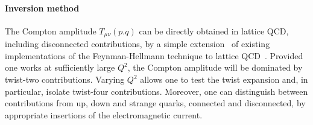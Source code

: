 \paragraph*{Inversion method} 
\label{Sec:InversionMethod}

The Compton amplitude $T_{\mu\nu}(p.q)$ can be directly obtained in lattice QCD, including disconnected contributions,  by a simple extension~\cite{Chambers:2017dov} of existing implementations of the Feynman-Hellmann technique to lattice QCD~\cite{Horsley:2012pz,Chambers:2014qaa,Chambers:2015bka}. Provided one works at sufficiently large $Q^2$, the Compton amplitude will be dominated by twist-two contributions. Varying $Q^2$ allows one to test the twist expansion and, in particular, isolate twist-four contributions. Moreover, one can distinguish between contributions from up, down and strange quarks, connected and disconnected, by appropriate insertions of the electromagnetic current.

